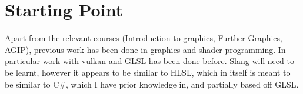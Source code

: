\section*{Starting Point}

Apart from the relevant courses (Introduction to graphics, Further
Graphics, AGIP),
previous work has been done in graphics and shader programming. In particular
work with vulkan and GLSL has been done before. Slang will need to be learnt,
however it appears to be similar to HLSL, which in itself is meant to be similar
to C\#, which I have prior knowledge in, and partially based off GLSL.
